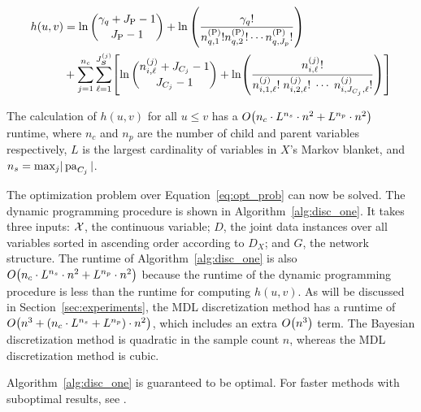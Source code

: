 \begin{small}
  \begin{equation}
  \label{eqn:h_function}
  \begin{aligned}
  h(u,v) &=  \ln {{\gamma_{q} + J_\text{P} - 1}\choose{J_\text{P}-1}} + \ln \left( { {{\gamma_q}!}\over{ {n^{(\text{P})}_{q,1} !} {n^{(\text{P})}_{q,2} !} \cdots {n^{(\text{P})}_{q,J_p} !}} } \right) \\
  & + \sum_{j=1}^{n_c} \sum_{\ell=1}^{J^{(j)}_{\bm{S}}} \brock{
    { \ln
            {{n^{(j)}_{i,\ell} + J_{C_j} - 1}\choose{J_{C_j}-1}}}
      +
      \ln \paren{ {
            \frac{
              {n^{(j)}_{i,\ell}}!
            }{
              {n^{(j)}_{i,1,\ell}!} \; {n^{(j)}_{i,2,\ell}!} \; \cdots \; {n^{(j)}_{i,J_{C_j},\ell}!}
            }
          }
          } }
  \end{aligned}
  \end{equation}
\end{small}

The calculation of $h(u,v)$ for all $u \leq v$ has a $\bigo \paren{ n_c \cdot {L}^{n_s} \cdot n^2 + {L}^{n_p} \cdot n^2 }$ runtime, where $n_c$ and $n_p$ are the number of child and parent variables respectively, $L$ is the largest cardinality of variables in $X$'s Markov blanket, and $n_s = \text{max}_j  |\operatorname{pa}_{C_j}|$.

The optimization problem over Equation~\ref{eq:opt_prob} can now be solved.
The dynamic programming procedure is shown in Algorithm~\ref{alg:disc_one}.
It takes three inputs: $\mathcal{X}$, the continuous variable; $D$, the joint data instances over all variables sorted in ascending order according to $D_X$; and $G$, the network structure.
The runtime of Algorithm~\ref{alg:disc_one} is also $\bigo \paren{ n_c \cdot {L}^{n_s} \cdot n^2 + {L}^{n_p} \cdot n^2 }$ because the runtime of the dynamic programming procedure is less than the runtime for computing $h(u,v)$.
As will be discussed in Section~\ref{sec:experiments}, the MDL discretization method has a runtime of $\bigo\paren{ n^3 + \paren{ n_c \cdot {L}^{n_s} + {L}^{n_p}} \cdot n^2 }$, which includes an extra $\bigo\paren{ n^3}$ term.
The Bayesian discretization method is quadratic in the sample count $n$, whereas the MDL discretization method is cubic.

Algorithm~\ref{alg:disc_one} is guaranteed to be optimal.
For faster methods with suboptimal results, see \citet{Boulle_2006}.


